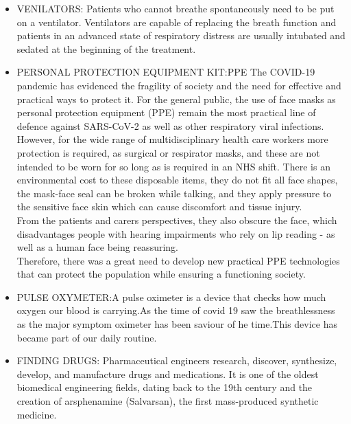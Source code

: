 \documentclass[12 pt]{report}
\begin{document}
\begin{itemize}
\item VENILATORS: Patients who cannot breathe spontaneously need to be put on a ventilator. Ventilators are capable of replacing the breath function and patients in an advanced state of respiratory distress are usually intubated and sedated at the beginning of the treatment.
\item PERSONAL PROTECTION EQUIPMENT KIT:PPE The COVID-19 pandemic has evidenced the fragility of society and the need for effective and practical ways to protect it. For the general public, the use of face masks as personal protection equipment (PPE) remain the most practical line of defence against SARS-CoV-2 as well as other respiratory viral infections.\\However, for the wide range of multidisciplinary health care workers more protection is required, as surgical or respirator masks, and these are not intended to be worn for so long as is required in an NHS shift. There is an environmental cost to these disposable items, they do not fit all face shapes, the mask-face seal can be broken while talking, and they apply pressure to the sensitive face skin which can cause discomfort and tissue injury.\\

From the patients and carers perspectives, they also obscure the face, which disadvantages people with hearing impairments who rely on lip reading - as well as a human face being reassuring.\\

Therefore, there was a great need to develop new practical PPE technologies that can protect the population while ensuring a functioning society. 
\item PULSE OXYMETER:A pulse oximeter is a device that checks how much oxygen our blood is carrying.As the time of covid 19 saw the breathlessness as the major symptom oximeter has been saviour of he time.This device has became part of our daily routine.
\item FINDING DRUGS:
Pharmaceutical engineers research, discover, synthesize, develop, and manufacture drugs and medications. It is one of the oldest biomedical engineering fields, dating back to the 19th century and the creation of arsphenamine (Salvarsan), the first mass-produced synthetic medicine.\\

 


\end{itemize}
\end{document}
